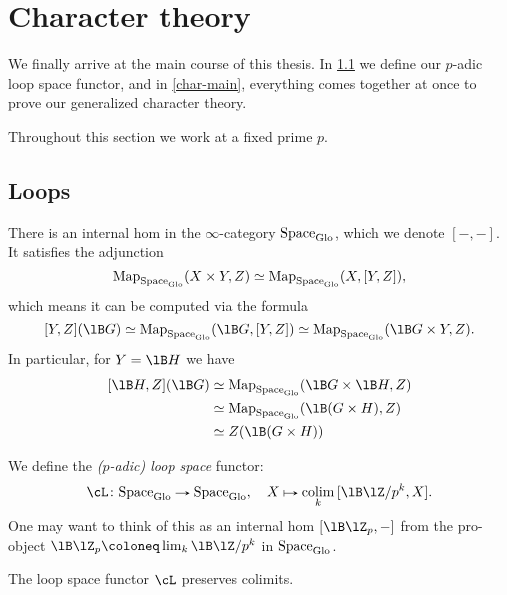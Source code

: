 \section{Character theory}
\label{char}

We finally arrive at the main course of this thesis. In
\cref{char-loops} we define our $p$-adic loop space functor, and in
\cref{char-main}, everything comes together at once to prove our
generalized character theory.

\begin{notation}
  \label{char-fixp}
  Throughout this section we work at a fixed prime $p$.
\end{notation}


\subsection{Loops}
\label{char-loops}

\begin{notation}
  \label{char-inthom}
  There is an internal hom in the $\infty$-category $\mathrm{Space}_{\mathrm{Glo}}$,
  which we denote $[-,-]$. It satisfies the adjunction
  \[
  \operatorname{Map}_{\mathrm{Space}_{\mathrm{Glo}}}(X \times Y, Z) \simeq
  \operatorname{Map}_{\mathrm{Space}_{\mathrm{Glo}}}(X, [Y,Z]),
  \]
  which means it can be computed via the formula
  \[
  [Y,Z](\lB G) \iso
  \Map_{\Space_\Glo}(\lB G, [Y,Z]) \iso
  \Map_{\Space_\Glo}(\lB G \times Y, Z).
  \]
  In particular, for $Y = \lB H$ we have
  \begin{align}
    \label{char-inthom-case}
    [\lB H,Z](\lB G) &\iso
    \Map_{\Space_\Glo}(\lB G \times \lB H, Z) \\ &\iso
    \Map_{\Space_\Glo}(\lB (G \times H), Z) \nonumber \\ &\iso
    Z(\lB (G \times H)) \nonumber
  \end{align}
\end{notation}

\begin{definition}
  \label{char-loopdfn}
  We define the \emph{($p$-adic) loop space} functor:
  \[
  \cL \c \Space_\Glo \to \Space_\Glo, \quad
  X \mapsto \colim_k {[\lB\lZ/p^k, X]}.
  \]
  One may want to think of this as an internal hom $[\lB\lZ_p, -]$
  from the pro-object $\lB\lZ_p \ce \lim_k \lB\lZ/p^k$ in
  $\mathrm{Space}_{\mathrm{Glo}}$.
\end{definition}

\begin{lemma}
  \label{char-loop-colim}
  The loop space functor $\cL$ preserves colimits.
\end{lemma}

